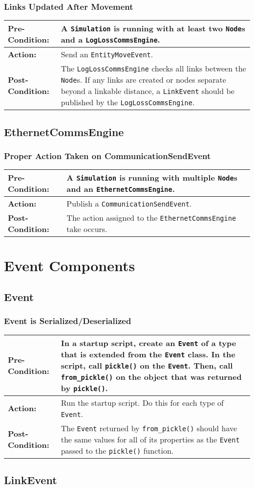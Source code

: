 \documentclass[titlepage]{article}
\newcommand{\testcase}[3]{
    \begin{center}
    \begin{tabular}{| l | p{0.7\textwidth}|}
        \hline
        \rowcolor[gray]{0.8}\textbf{Pre-Condition:} & #1 \\ \hline
        \textbf{Action:} & #2 \\ \hline
        \rowcolor[gray]{0.8}\textbf{Post-Condition:} & #3 \\ \hline
    \end{tabular}
    \end{center}
}
\begin{document}
\subsubsection{Links Updated After Movement}
\testcase{A \texttt{Simulation} is running with at least two \texttt{Node}s and a \texttt{LogLossCommsEngine}.}{Send an \texttt{EntityMoveEvent}.}{The \texttt{LogLossCommsEngine} checks all links between the \texttt{Node}s. If any links are created or nodes separate beyond a linkable distance, a \texttt{LinkEvent} should be published by the \texttt{LogLossCommsEngine}.}

\subsection{EthernetCommsEngine}
\subsubsection{Proper Action Taken on CommunicationSendEvent}
\testcase{A \texttt{Simulation} is running with multiple \texttt{Node}s and an \texttt{EthernetCommsEngine}.}{Publish a \texttt{CommunicationSendEvent}.}{The action assigned to the \texttt{EthernetCommsEngine} take occurs.}

\section{Event Components}
\subsection{Event}
\subsubsection{Event is Serialized/Deserialized}
\testcase{In a startup script, create an \texttt{Event} of a type that is extended from the \texttt{Event} class. In the script, call \texttt{pickle()} on the \texttt{Event}. Then, call \texttt{from\_pickle()} on the object that was returned by \texttt{pickle()}.}{Run the startup script. Do this for each type of \texttt{Event}.}{The \texttt{Event} returned by \texttt{from\_pickle()} should have the same values for all of its properties as the \texttt{Event} passed to the \texttt{pickle()} function.}

\subsection{LinkEvent}
\end{document}
